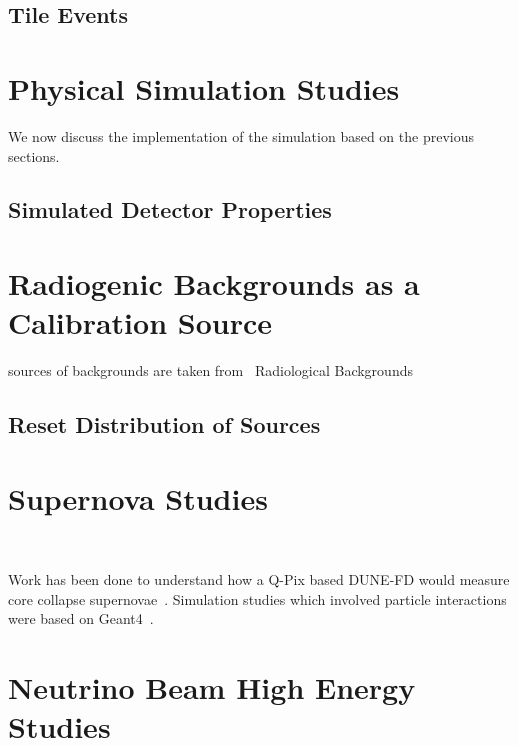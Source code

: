 \subsection{Tile Events}

\section{Physical Simulation Studies}

We now discuss the implementation of the simulation based on the previous sections.

\subsection{Simulated Detector Properties}


\section{Radiogenic Backgrounds as a Calibration Source}

sources of backgrounds are taken from~\citep{DUNE-FD_TDRv4:Abi_2020}
Radiological Backgrounds~\citep{ar39_backgrounds, phd_backgrounds}



\subsection{Reset Distribution of Sources}



\section{Supernova Studies}~\label{sec:supernova}

Work has been done to understand how a Q-Pix based DUNE-FD would measure core collapse supernovae~\citep{qpix:shion}.
Simulation studies which involved particle interactions were based on Geant4~\citep{geant4:AGOSTINELLI2003250}.


\section{Neutrino Beam High Energy Studies}~\label{sec:neutrino_studies}


